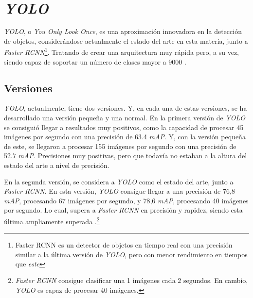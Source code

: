 


\section{\textit{YOLO}}

\textit{YOLO}, o \textit{You Only Look Once}, es una aproximación innovadora en la detección de objetos, considerándose actualmente el estado del arte en esta materia, junto a \textit{Faster RCNN}\footnote{Faster RCNN es un detector de objetos en tiempo real con una precisión similar a la última versión de \textit{YOLO}, pero con menor rendimiento en tiempos que \textit{este}}. Tratando de crear una arquitectura muy rápida pero, a su vez, siendo capaz de soportar un número de clases mayor a 9000 \cite{yolov2}.

\subsection{Versiones}

\textit{YOLO}, actualmente, tiene dos versiones. Y, en cada una de estas versiones, se ha desarrollado una versión pequeña y una normal. En la primera versión de \textit{YOLO} se consiguió llegar a resultados muy positivos, como la capacidad de procesar 45 imágenes por segundo con una precisión de 63.4 \textit{mAP}. Y, con la versión pequeña de este, se llegaron a procesar 155 imágenes por segundo con una precisión de 52.7 \textit{mAP}\cite{yolo}. Precisiones muy positivas, pero que todavía no estaban a la altura del estado del arte a nivel de precisión.

En la segunda versión, se considera a \textit{YOLO} como el estado del arte, junto a \textit{Faster RCNN}. En esta versión, \textit{YOLO} consigue llegar a una precisión de 76,8 \textit{mAP}, procesando 67 imágenes por segundo, y 78,6 \textit{mAP}, procesando 40 imágenes por segundo. Lo cual, supera a \textit{Faster RCNN} en precisión y rapidez, siendo esta última ampliamente superada \cite{yolov2}.\footnote{\textit{Faster RCNN} consigue clasificar una 1 imágenes cada 2 segundos. En cambio, \textit{YOLO} es capaz de procesar 40 imágenes.}

